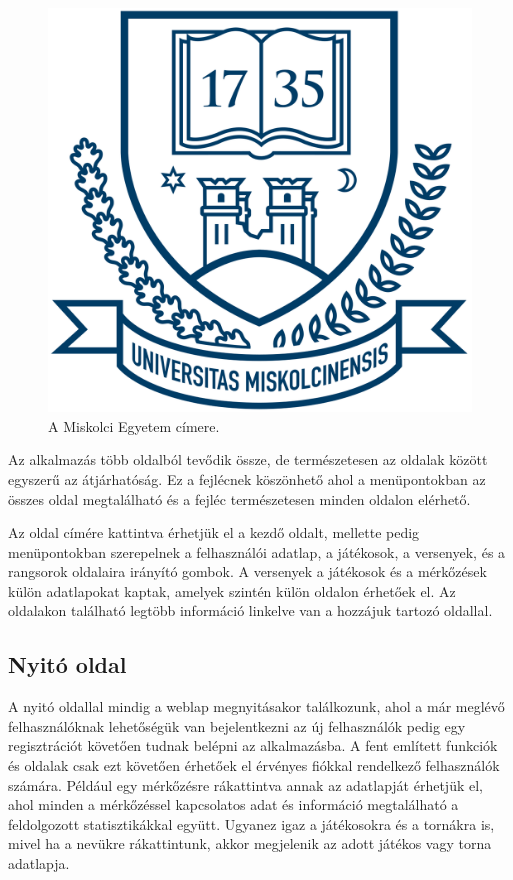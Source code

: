 \begin{figure}[h]
\centering
\includegraphics[scale=0.3]{images/me_logo.png}
\caption{A Miskolci Egyetem címere.}
\label{fig:cimer}
\end{figure}

Az alkalmazás több oldalból tevődik össze, de természetesen az oldalak között egyszerű az átjárhatóság. Ez a fejlécnek köszönhető ahol a menüpontokban az összes oldal megtalálható és a fejléc természetesen minden oldalon elérhető.

Az oldal címére kattintva érhetjük el a kezdő oldalt, mellette pedig menüpontokban szerepelnek a felhasználói adatlap, a játékosok, a versenyek, és a rangsorok oldalaira irányító gombok. A versenyek a játékosok és a mérkőzések külön adatlapokat kaptak, amelyek szintén külön oldalon érhetőek el.
Az oldalakon található legtöbb információ linkelve van a hozzájuk tartozó oldallal.

\subsection{Nyitó oldal}
A nyitó oldallal mindig a weblap megnyitásakor találkozunk, ahol a már meglévő felhasználóknak lehetőségük van bejelentkezni az új felhasználók pedig egy regisztrációt követően tudnak belépni az alkalmazásba. A fent említett funkciók és oldalak csak ezt követően érhetőek el érvényes fiókkal rendelkező felhasználók számára.
Például egy mérkőzésre rákattintva annak az adatlapját érhetjük el, ahol minden a mérkőzéssel kapcsolatos adat és információ megtalálható a feldolgozott statisztikákkal együtt. Ugyanez igaz a játékosokra és a tornákra is, mivel ha a nevükre rákattintunk, akkor megjelenik az adott játékos vagy torna adatlapja.

